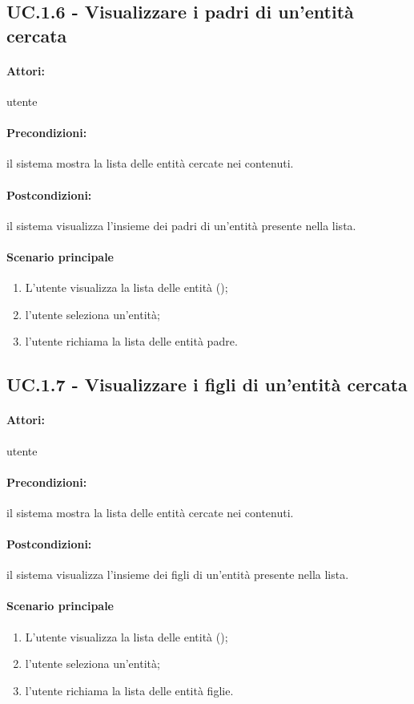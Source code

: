 \documentclass[10pt,a4paper,headinclude,footinclude,hidelinks]{scrreprt} %
\begin{document}
	\subsection[UC.1.6]{UC.1.6 - Visualizzare i padri di un'entità cercata}
	\label{ch:stage:ar:uc:1_6}
	\paragraph{Attori:} utente
	\paragraph{Precondizioni:} il sistema mostra la lista delle entità cercate nei contenuti.
	\paragraph{Postcondizioni:} il sistema visualizza l'insieme dei padri di un'entità presente nella lista.
	\paragraph{Scenario principale}
	\begin{enumerate}
	\item L'utente visualizza la lista delle entità ();
	\item l'utente seleziona un'entità;
	\item l'utente richiama la lista delle entità padre.
	\end{enumerate}

	\subsection[UC.1.7]{UC.1.7 - Visualizzare i figli di un'entità cercata}
	\label{ch:stage:ar:uc:1_8}
	\paragraph{Attori:} utente
	\paragraph{Precondizioni:} il sistema mostra la lista delle entità cercate nei contenuti.
	\paragraph{Postcondizioni:} il sistema visualizza l'insieme dei figli di un'entità presente nella lista.
	\paragraph{Scenario principale}
	\begin{enumerate}
	\item L'utente visualizza la lista delle entità ();
	\item l'utente seleziona un'entità;
	\item l'utente richiama la lista delle entità figlie.
	\end{enumerate}
\end{document}
